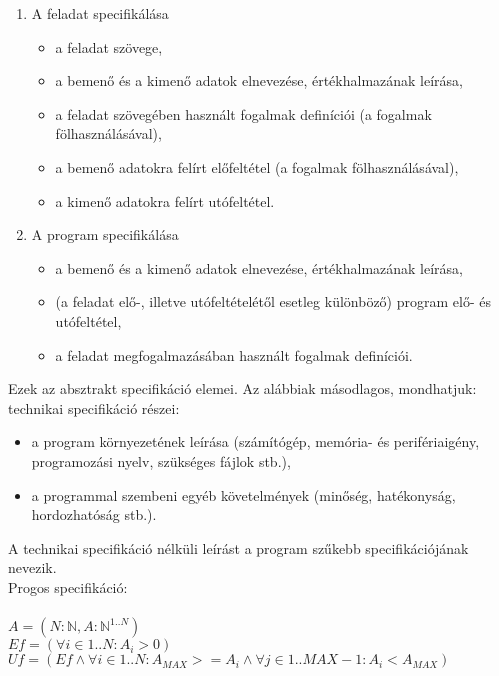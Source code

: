 \documentclass[margin=0px]{article}
\begin{document}
	\begin{enumerate}
		\item A feladat specifikálása
			\begin{itemize}
				\item a feladat szövege,
				\item a bemenő és a kimenő adatok elnevezése, értékhalmazának leírása,
				\item a feladat szövegében használt fogalmak definíciói (a fogalmak fölhasználásával),
				\item a bemenő adatokra felírt előfeltétel (a fogalmak fölhasználásával),
				\item a kimenő adatokra felírt utófeltétel.
			\end{itemize}
		\item A program specifikálása
			\begin{itemize}
				\item a bemenő és a kimenő adatok elnevezése, értékhalmazának leírása,
				\item (a feladat elő-, illetve utófeltételétől esetleg különböző) program elő- és utófeltétel,
				\item a feladat megfogalmazásában használt fogalmak definíciói.
			\end{itemize}
	\end{enumerate}	
	
	\noindent Ezek az absztrakt specifikáció elemei. Az alábbiak másodlagos, mondhatjuk: technikai specifikáció részei:
	
	\begin{itemize}
		\item a program környezetének leírása (számítógép, memória- és perifériaigény, programozási nyelv, szükséges fájlok stb.),
		\item a programmal szembeni egyéb követelmények (minőség, hatékonyság, hordozhatóság stb.).
	\end{itemize}

	\noindent A technikai specifikáció nélküli leírást a program szűkebb specifikációjának nevezik.\\
	
	\noindent Progos specifikáció:\\\\
	$A=(N : \mathbb{N}, A: \mathbb{N}^{1..N})$\\
	$Ef=(\forall i \in {1..N} : A_{i}>0)$\\
	$Uf=(Ef \land \forall i \in {1..N} : A_{MAX}>=A_{i} \land \forall j \in {1..MAX-1} : A_{i}<A_{MAX})$
\end{document}
